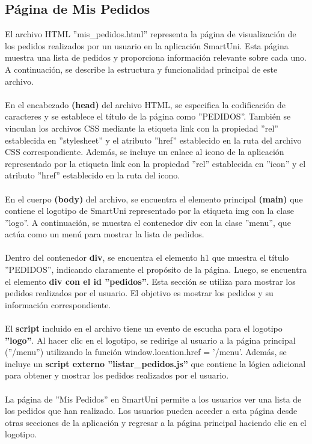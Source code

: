 \documentclass[12pt]{report}
\begin{document}
\subsection{Página de Mis Pedidos}
El archivo HTML ''mis\_pedidos.html'' representa la página de visualización de los pedidos realizados por un usuario en la aplicación SmartUni. Esta página muestra una lista de pedidos y proporciona información relevante sobre cada uno. A continuación, se describe la estructura y funcionalidad principal de este archivo.
\\\\En el encabezado \textbf{(head)} del archivo HTML, se especifica la codificación de caracteres y se establece el título de la página como ''PEDIDOS''. También se vinculan los archivos CSS mediante la etiqueta link con la propiedad ''rel'' establecida en ''stylesheet'' y el atributo ''href'' establecido en la ruta del archivo CSS correspondiente. Además, se incluye un enlace al icono de la aplicación representado por la etiqueta link con la propiedad ''rel'' establecida en ''icon'' y el atributo ''href'' establecido en la ruta del icono.
\\\\En el cuerpo\textbf{ (body)} del archivo, se encuentra el elemento principal \textbf{(main)} que contiene el logotipo de SmartUni representado por la etiqueta img con la clase ''logo''. A continuación, se muestra el contenedor div con la clase ''menu'', que actúa como un menú para mostrar la lista de pedidos.
\\\\Dentro del contenedor \textbf{div}, se encuentra el elemento h1 que muestra el título ''PEDIDOS'', indicando claramente el propósito de la página. Luego, se encuentra el elemento \textbf{div con el id ''pedidos''}. Esta sección se utiliza para mostrar los pedidos realizados por el usuario. El objetivo es mostrar los pedidos y su información correspondiente.
\\\\El \textbf{script}  incluido en el archivo tiene un evento de escucha para el logotipo \textbf{''logo''}. Al hacer clic en el logotipo, se redirige al usuario a la página principal (''/menu'') utilizando la función window.location.href = '/menu'. Además, se incluye un\textbf{ script externo ''listar\_pedidos.js'' }que contiene la lógica adicional para obtener y mostrar los pedidos realizados por el usuario.
\\\\
La página de ''Mis Pedidos'' en SmartUni permite a los usuarios ver una lista de los pedidos que han realizado. Los usuarios pueden acceder a esta página desde otras secciones de la aplicación y regresar a la página principal haciendo clic en el logotipo.
\end{document}
